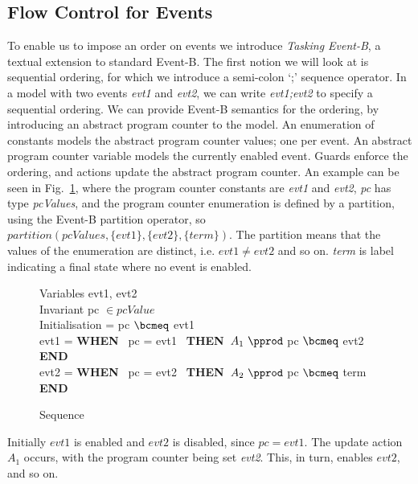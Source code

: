 \subsection{Flow Control for Events}\label{flow}
To enable us to impose an order on events we introduce \emph{Tasking Event-B}, a textual extension to standard Event-B. The first notion we will look at is sequential ordering, for which we introduce a semi-colon `;' sequence operator. In a model with two events \emph{evt1} and \emph{evt2}, we can write \emph{evt1;evt2} to specify a sequential ordering. We can provide Event-B semantics for the ordering, by introducing an abstract program counter to the model. An enumeration of constants models the abstract program counter values; one per event. An abstract program counter variable models the currently enabled event. Guards enforce the ordering, and actions update the abstract program counter. An example can be seen in Fig.~\ref{fig:seq}, where the program counter constants are \emph{evt1} and \emph{evt2}, \emph{pc} has type \emph{pcValues}, and the program counter enumeration is defined by a partition, using the Event-B partition operator, so $partition(pcValues, \{evt1\}, \{evt2\},\{term\})$. The partition means that the values of the enumeration are distinct, i.e. $evt1 \neq evt2$ and so on. \emph{term} is label indicating a final state where no event is enabled.
%
\begin{figure}
\centering
\begin{minipage}{0.7\textwidth}
Variables evt1, evt2\\
Invariant pc $\in pcValue$ \\
Initialisation = pc $\bcmeq$ evt1 \\
evt1 = \textbf{WHEN}~ pc = evt1~ \textbf{THEN}~$A_1~ \pprod$ pc $\bcmeq$ evt2 \textbf{END}\\
evt2 = \textbf{WHEN}~ pc = evt2~ \textbf{THEN}~$A_2~ \pprod$ pc $\bcmeq$ term \textbf{END}\\
\end{minipage}
\caption{Sequence}
\label{fig:seq}
\end{figure}
Initially $evt1$ is enabled and $evt2$ is disabled, since $pc = evt1$. The update action $A_1$ occurs, with the program counter being set \emph{evt2}. This, in turn, enables $evt2$, and so on.
